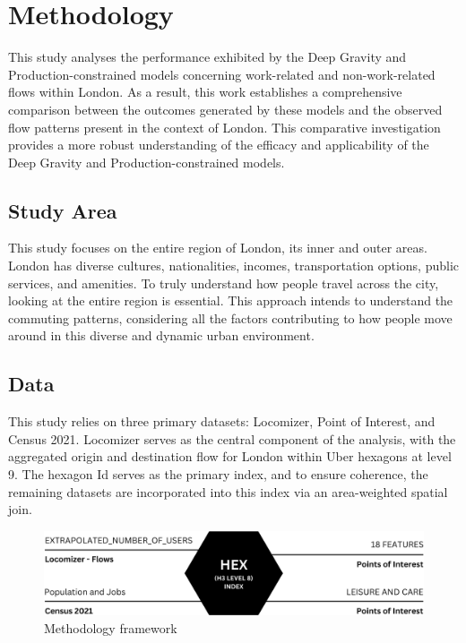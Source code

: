 \chapter{Methodology}
\label{chapterlabel3}

This study analyses the performance exhibited by the Deep Gravity and Production-constrained models concerning work-related and non-work-related flows within London. As a result, this work establishes a comprehensive comparison between the outcomes generated by these models and the observed flow patterns present in the context of London. This comparative investigation provides a more robust understanding of the efficacy and applicability of the Deep Gravity and Production-constrained models.




    \section{Study Area}

This study focuses on the entire region of London,  its inner and outer areas. London has diverse cultures, nationalities, incomes, transportation options, public services, and amenities. To truly understand how people travel across the city, looking at the entire region is essential. This approach intends to understand the commuting patterns, considering all the factors contributing to how people move around in this diverse and dynamic urban environment.



    \section{Data}

This study relies on three primary datasets: Locomizer, Point of Interest, and Census 2021. Locomizer serves as the central component of the analysis, with the aggregated origin and destination flow for London within Uber hexagons at level 9. The hexagon Id serves as the primary index, and to ensure coherence, the remaining datasets are incorporated into this index via an area-weighted spatial join.

    \begin{figure}[H]
        \centering
        \includegraphics[width=12cm]{Images/framework.png}
        \caption{Methodology framework}
        \label{fig: framework}
    \end{figure}


